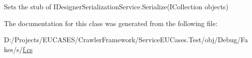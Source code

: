 Sets the stub of I\-Designer\-Serialization\-Service.\-Serialize(\-I\-Collection objects)



The documentation for this class was generated from the following file\-:\begin{DoxyCompactItemize}
\item 
D\-:/\-Projects/\-E\-U\-C\-A\-S\-E\-S/\-Crawler\-Framework/\-Service\-E\-U\-Cases.\-Test/obj/\-Debug/\-Fakes/s/\hyperlink{s_2f_8cs}{f.\-cs}\end{DoxyCompactItemize}
